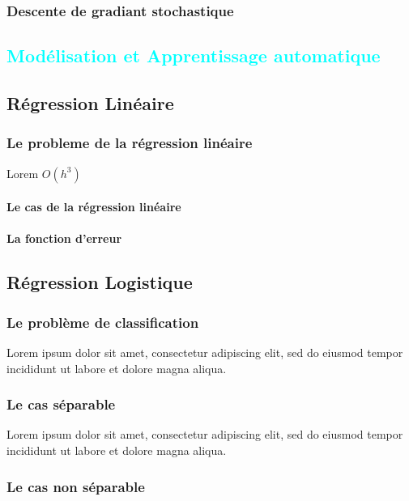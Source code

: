 	
		\lipsum[4]
	
	\subsection{Descente de gradiant stochastique}
		\lipsum[1]	
		
%
%


\textcolor{cyan}{\chapter{Modélisation et Apprentissage automatique}}

	\section{Régression Linéaire}
	\subsection{Le probleme de la régression linéaire}
		Lorem $O(h^3)$ 
		\lipsum[1]
	\subsubsection{Le cas de la régression linéaire}
		\lipsum[1]
	\subsubsection{La fonction d'erreur}
	
	
	\section{Régression Logistique}
	\subsection{Le problème de classification}
		Lorem ipsum dolor sit amet, consectetur adipiscing elit, sed do eiusmod tempor incididunt ut labore et dolore magna aliqua.
	\subsection{Le cas séparable }
		Lorem ipsum dolor sit amet, consectetur adipiscing elit, sed do eiusmod tempor incididunt ut labore et dolore magna aliqua.
	\subsection{Le cas non séparable }
		\lipsum[3]
